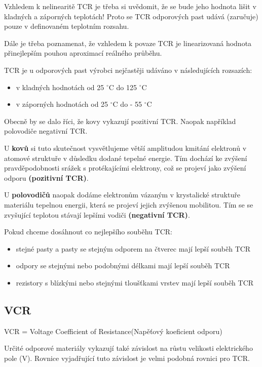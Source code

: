 Vzhledem k nelinearitě TCR je třeba si uvědomit, že se bude jeho hodnota lišit v kladných a
záporných teplotách! Proto se TCR odporových past udává (zaručuje) pouze v definovaném
teplotním rozsahu.

Dále je třeba poznamenat, že vzhledem k povaze TCR je linearizovaná hodnota
přinejlepším pouhou aproximací reálného průběhu.

TCR je u odporových past výrobci nejčastěji udáváno v následujících rozsazích:
\begin{itemize}
\item v kladných hodnotách od 25 $^{\circ}$C do 125 $^{\circ}$C
\item v záporných hodnotách od 25 $^{\circ}$C do - 55 $^{\circ}$C
\end{itemize}

Obecně by se dalo říci, že kovy vykazují pozitivní TCR. Naopak například polovodiče
negativní TCR.

U \textbf{kovů} si tuto skutečnost vysvětlujeme větší amplitudou kmitání elektronů v atomové
struktuře v důsledku dodané tepelné energie. Tím dochází ke zvýšení pravděpodobnosti
srážek s protékajícími elektrony, což se projeví jako zvýšení odporu \textbf{(pozitivní TCR)}.

U \textbf{polovodičů} naopak dodáme elektronům vázaným v krystalické struktuře materiálu
tepelnou energii, která se projeví jejich zvýšenou mobilitou. Tím se se zvyšující teplotou
stávají lepšími vodiči \textbf{(negativní TCR)}.

Pokud chceme dosáhnout co nejlepšího souběhu TCR:
\begin{itemize}
\item stejné pasty a pasty se stejným odporem na čtverec mají lepší souběh TCR
\item odpory se stejnými nebo podobnými délkami mají lepší souběh TCR
\item rezistory s blízkými nebo stejnými tloušťkami vrstev mají lepší souběh TCR
\end{itemize}

\subsection{VCR}
VCR = Voltage Coefficient of Resistance(Napěťový koeficient odporu)

Určité odporové materiály vykazují také závislost na růstu velikosti elektrického pole (V).
Rovnice vyjadřující tuto závislost je velmi podobná rovnici pro TCR.


